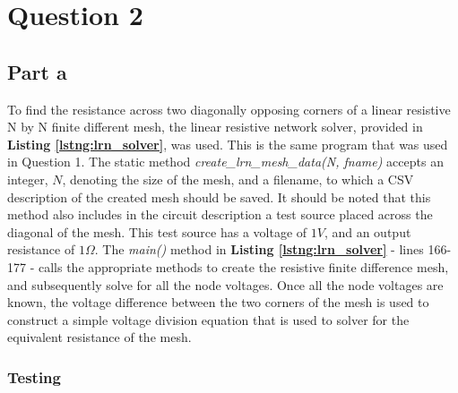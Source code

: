 \documentclass[11pt]{amsart}
\begin{document}
\section*{Question 2}

\subsection*{Part a} To find the resistance across two diagonally opposing corners of a linear resistive N by N finite different mesh, the linear resistive network solver, provided in \textbf{Listing \ref{lstng:lrn_solver}}, was used. This is the same program that was used in Question 1. The static method \textit{create\_lrn\_mesh\_data(N, fname)} accepts an integer, $N$, denoting the size of the mesh, and a filename, to which a CSV description of the created mesh should be saved. It should be noted that this method also includes in the circuit description a test source placed across the diagonal of the mesh. This test source has a voltage of $1V$, and an output resistance of $1 \Omega$. The \textit{main()} method in \textbf{Listing \ref{lstng:lrn_solver}} - lines 166-177 - calls the appropriate methods to create the resistive finite difference mesh, and subsequently solve for all the node voltages. Once all the node voltages are known, the voltage difference between the two corners of the mesh is used to construct a simple voltage division equation that is used to solver for the equivalent resistance of the mesh.

\subsubsection*{Testing}


\begin{landscape}
	
\end{landscape}
\begin{landscape}
	
\end{landscape}
\begin{landscape}
	
\end{landscape}
\end{document}
